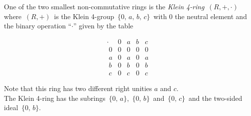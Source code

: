 \documentclass[12pt]{article}
\begin{document}
One of the two smallest non-commutative rings is the 
{\em Klein 4-ring}\, $(R,+,\cdot)$\, where\, $(R,+)$\, is the Klein 4-group \,$\{0,\,a,\,b,\,c\}$\, with $0$ the neutral element and the binary operation ``$\cdot$'' given by the table

$$\begin{array}{c|cccc}
\cdot & 0 & a & b & c \\
\hline
\;  0 & 0 & 0 & 0 & 0 \\
\;  a & 0 & a & 0 & a \\
\;  b & 0 & b & 0 & b \\
\;  c & 0 & c & 0 & c
  \end{array}$$

Note that this ring has two different right unities $a$ and $c$.\\

The Klein 4-ring has the subrings \,$\{0,\,a\}$,\, $\{0,\,b\}$\, and\, $\{0,\,c\}$\, and the two-sided ideal\, $\{0,\,b\}$.
\end{document}
